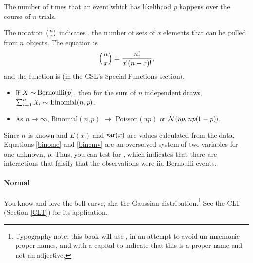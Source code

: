 The number of times that an event which has likelihood $p$ happens over the
course of $n$ trials.

The notation $\left({n\atop x}\right)$ indicates
, the number of sets of $x$ elements that can be
pulled from $n$ objects. The equation is $$\left({n\atop x}\right) =
{n!\over x!(n-x)!},$$ and the function is  
(in the GSL's Special Functions section).
 


\begin{itemize}
\item If $X \sim {\rm Bernoulli}(p)$, then for the sum of $n$ independent draws,
$\sum_{i=1}^n X_i \sim {\rm Binomial}(n,p)$.
\item As $n\to\infty$, Binomial$(n,p)$ $\to$ Poisson$(np)$ or ${\cal
N}(np, np(1-p))$.
\end{itemize}

Since $n$ is known and $E(x)$ and $\operatorname{var}(x)$ are values calculated from
the data, Equations \ref{binome} and \ref{binomv} are an oversolved
system of two variables for one unknown, $p$. Thus, you can test for
, which indicates that there are interactions that
falsify that the observations were iid Bernoulli events.

\paragraph{Normal}

You know and love the bell curve, aka the Gaussian
distribution.\footnote{Typography note: this book will use ,
in an attempt to avoid un-mnemonic proper names, and with a capital to indicate
that this is a proper name and not an adjective.} See the CLT (Section
\ref{CLT}) for its application.


